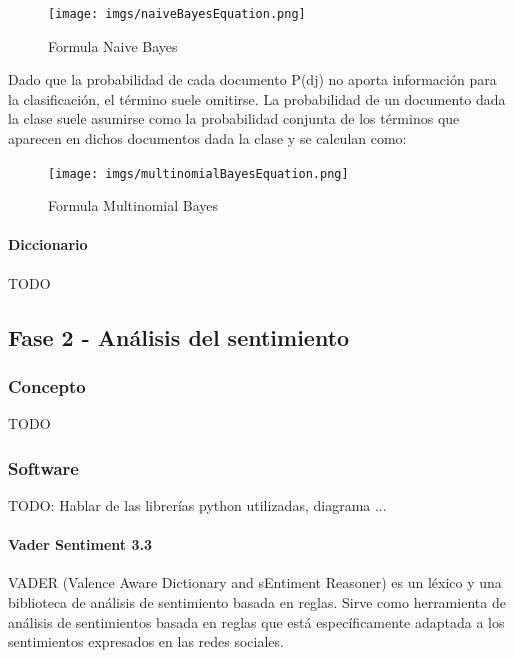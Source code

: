 \documentclass[../all.tex]{subfiles}
\begin{document}
        	\begin{figure}[H]
        		\centering
        		\texttt{[image: imgs/naiveBayesEquation.png]}
        		\caption{Formula Naive Bayes}
        	\end{figure}
        	
        	Dado que la probabilidad de cada documento P(d{\tiny j}) no aporta información
        	para la clasificación, el término suele omitirse. La probabilidad de un documento
        	dada la clase suele asumirse como la probabilidad conjunta de los términos que
        	aparecen en dichos documentos dada la clase y se calculan como:
        	\begin{figure}[H]
        		\centering
        		\texttt{[image: imgs/multinomialBayesEquation.png]}
        		\caption{Formula Multinomial Bayes}
        	\end{figure}
            
        \newpage
        \paragraph{Diccionario}
        	
            {\color{red} 
                TODO
            }

\newpage
\subsection{Fase 2 - Análisis del sentimiento}
    \subsubsection{Concepto}
            {\color{red} 
                TODO
            }
    \subsubsection{Software}
        {\color{red} 
        TODO: Hablar de las librerías python utilizadas, diagrama ...
        }
    
    	\newpage
        \paragraph{Vader Sentiment 3.3}
        
        	VADER (Valence Aware Dictionary and sEntiment Reasoner) es un léxico y una biblioteca de análisis de sentimiento basada en reglas. Sirve como herramienta de análisis de sentimientos basada en reglas que está específicamente adaptada a los sentimientos expresados en las redes sociales.\\
        	
\end{document}
